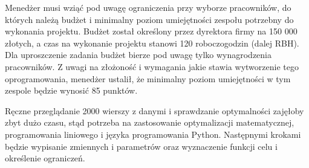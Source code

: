     \par Menedżer musi wziąć pod uwagę ograniczenia przy wyborze pracowników, do których należą budżet i minimalny poziom umiejętności zespołu potrzebny do wykonania projektu. Budżet został określony przez dyrektora firmy na 150 000 złotych, a czas na wykonanie projektu stanowi 120 roboczogodzin (dalej RBH). Dla uproszczenie zadania budżet bierze pod uwagę tylko wynagrodzenia pracowników. Z uwagi na złożoność i wymagania jakie stawia wytworzenie tego oprogramowania, menedżer ustalił, że minimalny poziom umiejętności w tym zespole będzie wynosić 85 punktów.
    \par Ręczne przeglądanie 2000 wierszy z danymi i sprawdzanie optymalności zajęłoby zbyt dużo czasu, stąd potrzeba na zastosowanie optymalizacji matematycznej, programowania liniowego i języka programowania Python. Następnymi krokami będzie wypisanie zmiennych i parametrów oraz wyznaczenie funkcji celu i określenie ograniczeń.

